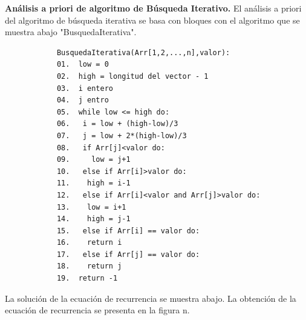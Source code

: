 \documentclass[12pt,twoside]{article}
\begin{document}
\textbf{Análisis a priori de algoritmo de Búsqueda Iterativo.} 
El análisis a priori del algoritmo de búsqueda iterativa se basa con bloques con el algoritmo que se muestra abajo "BusquedaIterativa". 
\par
\begin{center}
  \begin{verbatim}
            BusquedaIterativa(Arr[1,2,...,n],valor):
            01.  low = 0
            02.  high = longitud del vector - 1
            03.  i entero 
            04.  j entro
            05.  while low <= high do:
            06.   i = low + (high-low)/3
            07.   j = low + 2*(high-low)/3
            08.   if Arr[j]<valor do:
            09.     low = j+1
            10.   else if Arr[i]>valor do:
            11.    high = i-1
            12.   else if Arr[i]<valor and Arr[j]>valor do:
            13.    low = i+1
            14.    high = j-1
            15.   else if Arr[i] == valor do:
            16.    return i
            17.   else if Arr[j] == valor do:
            18.    return j
            19.  return -1
  \end{verbatim}
  \end{center}
  La solución de la ecuación de recurrencia se muestra abajo. La obtención de la ecuación de recurrencia se presenta en la figura n.
\end{document}
